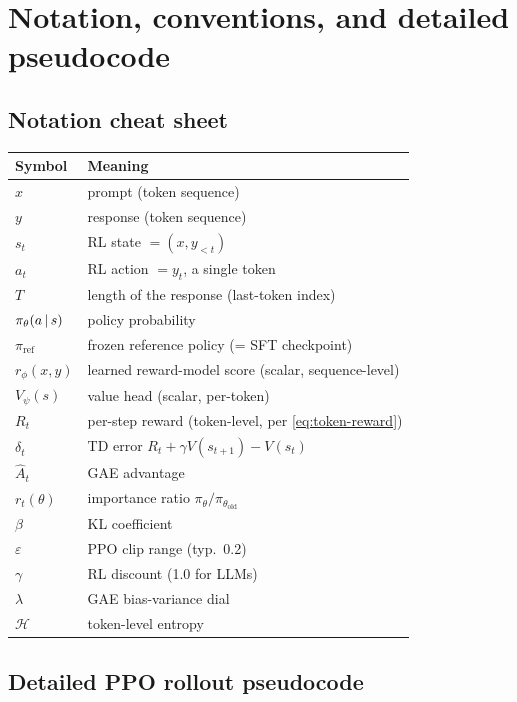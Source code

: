 \documentclass[11pt,oneside]{scrbook}
\begin{document}
\chapter{Notation, conventions, and detailed pseudocode}

\section{Notation cheat sheet}

\begin{center}
\small
\begin{tabular}{ll}
\toprule
Symbol & Meaning \\
\midrule
$x$ & prompt (token sequence) \\
$y$ & response (token sequence) \\
$s_t$ & RL state $= (x, y_{<t})$ \\
$a_t$ & RL action $= y_t$, a single token \\
$T$ & length of the response (last-token index) \\
$\pi_\theta(a \,\vert\, s)$ & policy probability \\
$\pi_{\text{ref}}$ & frozen reference policy (= SFT checkpoint) \\
$r_\phi(x, y)$ & learned reward-model score (scalar, sequence-level) \\
$V_\psi(s)$ & value head (scalar, per-token) \\
$R_t$ & per-step reward (token-level, per \eqref{eq:token-reward}) \\
$\delta_t$ & TD error $R_t + \gamma V(s_{t+1}) - V(s_t)$ \\
$\hat A_t$ & GAE advantage \\
$r_t(\theta)$ & importance ratio $\pi_\theta / \pi_{\theta_{\text{old}}}$ \\
$\beta$ & KL coefficient \\
$\varepsilon$ & PPO clip range (typ.\ 0.2) \\
$\gamma$ & RL discount (1.0 for LLMs) \\
$\lambda$ & GAE bias-variance dial \\
$\mathcal{H}$ & token-level entropy \\
\bottomrule
\end{tabular}
\end{center}

\section{Detailed PPO rollout pseudocode}
\end{document}

